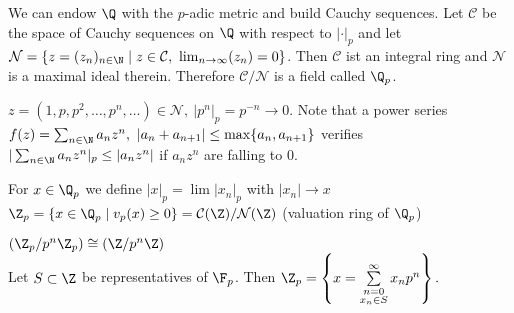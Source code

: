 \documentclass{jvfscript}
\begin{document}
	We can endow $\Q$ with the $p$-adic metric and build Cauchy sequences. Let $\mathcal{C}$ be the space of Cauchy sequences on $\Q$ with respect to $|\cdot|_p$ and let $\mathcal{N} = \{z = (z_n)_{n \in \N} \mid z \in \mathcal{C},\ \lim_{n \to \infty}(z_n) = 0\}$. Then $\mathcal{C}$ ist an integral ring and $\mathcal{N}$ is a maximal ideal therein. Therefore $\mathcal{C}/\mathcal{N}$ is a field called $\Q_p$.
	
	\begin{exmp}
		$z = (1,p,p^2,\dotsc,p^n,\dotsc) \in \mathcal{N},\ |p^n|_p = p^{-n} \to 0$. Note that a power series $ f(z) = \sum_{n \in \N} a_n z^n,\ |a_n + a_{n+1}| \leq \max\{a_n,a_{n+1}\} $ verifies $ |\sum_{n \in \N} a_nz^n|_p \leq |a_nz^n| $ if $ a_nz^n $ are falling to 0.
	\end{exmp}

	\begin{defn}[Limits in $\Q_p$]
		For $ x \in \Q_p $ we define $ |x|_p = \lim|x_n|_p $ with $|x_n| \to x$\\
		$ \Z_p = \{x \in \Q_p \mid v_p(x) \geq 0\} = \mathcal{C}(\Z)/\mathcal{N}(\Z) $ (valuation ring of $\Q_p$)
	\end{defn}	
	$ \left( \Z_p/p^n\Z_p \right) \cong \left( \Z/p^n\Z \right) $\\
	Let $ S \subset \Z $ be representatives of $ \F_p $. Then $ \Z_p = \left\{ x = \sum\limits_{\substack{n=0\\x_n \in S}}^\infty x_n p^n \right\}. $
	
	
	\printindex
\end{document}
